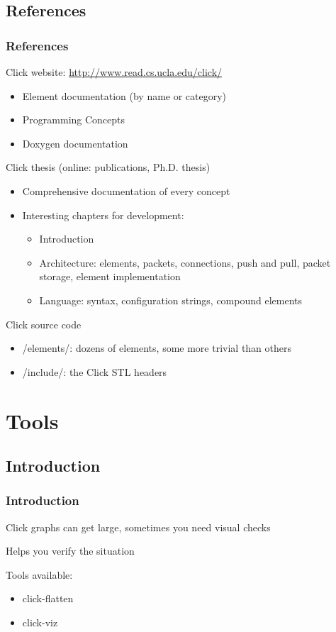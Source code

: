 \documentclass{beamer}
\begin{document}
\subsection{References} %
\label{sub:references}
\begin{frame}
\frametitle{References}
Click website: \url{http://www.read.cs.ucla.edu/click/}
\begin{itemize}
	\item Element documentation (by name or category)
	\item Programming Concepts
	\item Doxygen documentation
\end{itemize}
Click thesis (online: publications, Ph.D. thesis)
\begin{itemize}
	\item Comprehensive documentation of every concept
	\item Interesting chapters for development:
	\begin{itemize}
		\item Introduction
		\item Architecture: elements, packets, connections, push and pull, packet storage, element implementation
		\item Language: syntax, configuration strings, compound elements
	\end{itemize}
\end{itemize}
Click source code
\begin{itemize}
	\item /elements/: dozens of elements, some more trivial than others
	\item /include/: the Click STL headers
\end{itemize}
\end{frame}

\section{Tools}
\subsection{Introduction} %
\label{sub:introduction}

\begin{frame}
\frametitle{Introduction}
Click graphs can get large, sometimes you need visual checks

Helps you verify the situation

Tools available:
\begin{itemize}
	\item click-flatten
	\item click-viz
\end{itemize}
\end{frame}
\end{document}

